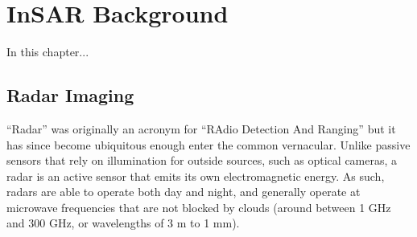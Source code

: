 
\chapter{InSAR Background}
\label{CHAP:3}

In this chapter...



\section{Radar Imaging}
\label{CHAP:3-radar}

``Radar'' was originally an acronym for ``RAdio Detection And Ranging'' but it has since become ubiquitous enough enter the common vernacular. Unlike passive sensors that rely on illumination for outside sources, such as optical cameras, a radar is an active sensor that emits its own electromagnetic energy. 
As such, radars are able to operate both day and night, and generally operate at microwave frequencies that are not blocked by clouds (around between 1 GHz and 300 GHz, or wavelengths of 3 m to 1 mm).

